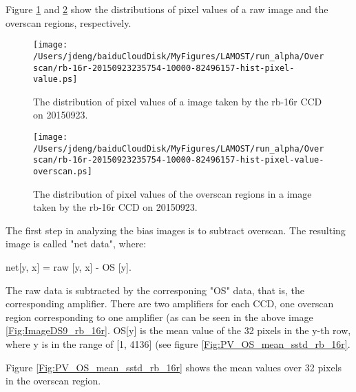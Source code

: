 \documentclass[12pt,twoside,letterpaper]{article}
\begin{document}
Figure \ref{Fig:PV_rb_16r} and \ref{Fig:PV_OS_rb_16r} show the
distributions of pixel values of a raw image and the overscan regions, respectively.  

   \begin{figure}[!htbp]
   \begin{center}
       \texttt{[image: /Users/jdeng/baiduCloudDisk/MyFigures/LAMOST/run\_alpha/Overscan/rb-16r-20150923235754-10000-82496157-hist-pixel-value.ps]}
       \caption{The distribution of pixel values of a image taken by the rb-16r CCD on 20150923.}
       \label{Fig:PV_rb_16r}
   \end{center}    
   \end{figure}

   \begin{figure}[!htbp]
   \begin{center}
       \texttt{[image: /Users/jdeng/baiduCloudDisk/MyFigures/LAMOST/run\_alpha/Overscan/rb-16r-20150923235754-10000-82496157-hist-pixel-value-overscan.ps]}
       \caption{The distribution of pixel values of the overscan regions in a image taken by the rb-16r CCD on 20150923.}
       \label{Fig:PV_OS_rb_16r}
   \end{center}    
   \end{figure}
The first step in analyzing the bias images is to subtract overscan. 
The resulting image is called "net data", where: 

net[y, x]  = raw [y, x]  - OS [y]. 

The raw data is subtracted by the corresponing "OS" data, that is, the
corresponding amplifier. There are two amplifiers for each CCD, one
overscan region corresponding to one amplifier (as can be seen in the
above image \ref{Fig:ImageDS9_rb_16r}. 
OS[y] is the mean value of the 32 pixels in the y-th row, where y is
in the range of [1, 4136] (see figure \ref{Fig:PV_OS_mean_sstd_rb_16r}. 


Figure \ref{Fig:PV_OS_mean_sstd_rb_16r} shows the mean values over 32
pixels in the overscan region. 
\end{document}
